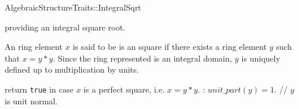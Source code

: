 

\begin{ccRefConcept}{AlgebraicStructureTraits::IntegralSqrt}

\begin{ccAdvanced}
\ccDefinition

 providing an integral square root. 

An ring element $x$ is said to be is an square if there exists a ring element $y$ such 
that $x= y*y$. Since the ring represented is an integral domain, 
$y$ is uniquely defined up to multiplication by units. 

\ccRefines 


\ccTypes

\ccGlue
{}\ccGlue
{}

\ccOperations
{}
        { return {\tt true} in case $x$ is a perfect square, i.e. $x = y*y$.
          \ccPostcond: $unit\_part(y) = 1$. // $y$ is unit normal. 
        }


\ccSeeAlso

\end{ccAdvanced}

\end{ccRefConcept} 